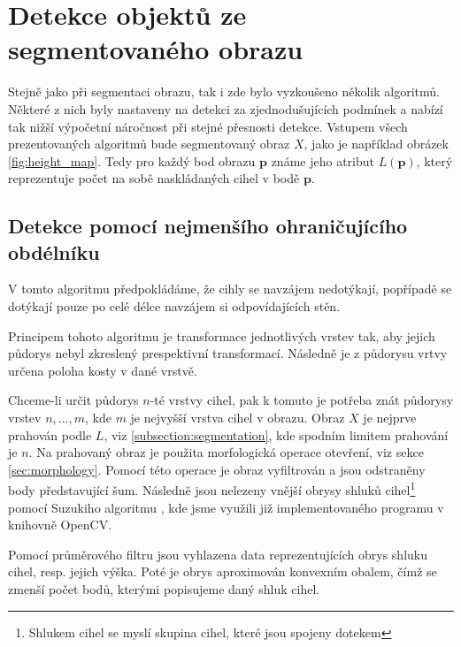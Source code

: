 \documentclass[twoside]{ctuthesis}
\newcommand{\tl}[1]{$\mathbf{#1}$}
\begin{document}
\section{Detekce objektů ze segmentovaného obrazu}
Stejně jako při segmentaci obrazu, tak i zde bylo vyzkoušeno několik algoritmů. Některé z nich byly nastaveny na detekci za zjednodušujících podmínek a nabízí tak nižší výpočetní náročnost při stejné přesnosti detekce. 
Vstupem všech prezentovaných algoritmů bude segmentovaný obraz $X$, jako je například obrázek \ref{fig:height_map}. Tedy pro každý bod obrazu \tl{p} známe jeho atribut $L(\mathbf{p})$, který reprezentuje počet na sobě naskládaných cihel v bodě \tl{p}. %

\subsection{Detekce pomocí nejmenšího ohraničujícího obdélníku}
\label{sec:bounding_rect}
V tomto algoritmu předpokládáme, že cihly se navzájem nedotýkají, popřípadě se dotýkají pouze po celé délce navzájem si odpovídajících stěn.

Principem tohoto algoritmu je transformace jednotlivých vrstev tak, aby jejich půdorys nebyl zkreslený prespektivní transformací. Následně je z půdorysu vrtvy určena poloha kosty v dané vrstvě.

Chceme-li určit půdorys $n$-té vrstvy cihel, pak k tomuto je potřeba znát půdorysy vrstev $n,...,m$, kde $m$ je nejvyšší vrstva cihel v obrazu. 
Obraz $X$ je nejprve prahován podle $L$, viz \ref{subsection:segmentation}, kde spodním limitem prahování je $n$. Na prahovaný obraz je použita morfologická operace otevření, viz sekce \ref{sec:morphology}. Pomocí této operace je obraz vyfiltrován a jsou odstraněny body představující šum. Následně jsou nelezeny vnější obrysy  shluků cihel\footnote{Shlukem cihel se myslí skupina cihel, které jsou spojeny dotekem} pomocí Suzukiho algoritmu \cite{suzuki1985topological}, kde jsme využili již implementovaného programu v knihovně OpenCV.

Pomocí průměrového filtru jsou vyhlazena data reprezentujících obrys shluku cihel, resp. jejich výška. Poté je obrys aproximován konvexním obalem, čímž se zmenší počet bodů, kterými popisujeme daný shluk cihel.
\end{document}
